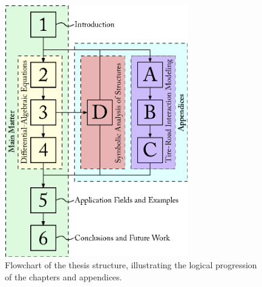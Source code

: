 \begin{figure}[htb]
  \centering
  \includegraphics[width=8cm]{./figures/chapter_1/thesis_flowchart}
  \caption{Flowchart of the thesis structure, illustrating the logical progression of the chapters and appendices.}
  \label{chap1:fig:thesis_flowchart}
\end{figure}

